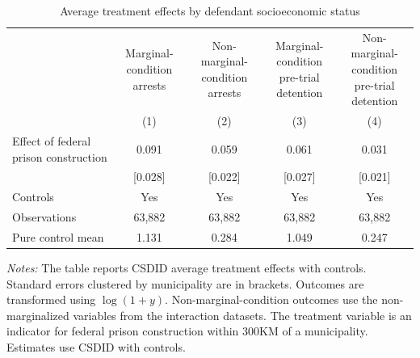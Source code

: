 \begin{table}[!htpb]\centering
\caption{Average treatment effects by defendant socioeconomic status}
\label{tab:att_marginalized}
\scriptsize
\begin{threeparttable}
\begin{tabular}{@{\extracolsep{0pt}}lcccc}
\hline\hline
 & \shortstack{Marginal-condition\\ arrests} & \shortstack{Non-marginal-condition\\ arrests} & \shortstack{Marginal-condition\\ pre-trial detention} & \shortstack{Non-marginal-condition\\ pre-trial detention} \\
 & (1) & (2) & (3) & (4) \\
\hline
Effect of federal prison construction & 0.091 & 0.059 & 0.061 & 0.031 \\
 & [0.028] & [0.022] & [0.027] & [0.021] \\
Controls & Yes & Yes & Yes & Yes \\
Observations & 63,882 & 63,882 & 63,882 & 63,882 \\
Pure control mean & 1.131 & 0.284 & 1.049 & 0.247 \\
\hline\hline
\end{tabular}
\begin{minipage}{0.95\textwidth}
\footnotesize \emph{Notes:} The table reports CSDID average treatment effects with controls. Standard errors clustered by municipality are in brackets. Outcomes are transformed using \(\log(1+y)\). Non-marginal-condition outcomes use the non-marginalized variables from the interaction datasets. The treatment variable is an indicator for federal prison construction within 300KM of a municipality. Estimates use CSDID with controls.
\end{minipage}
\end{threeparttable}
\end{table}

